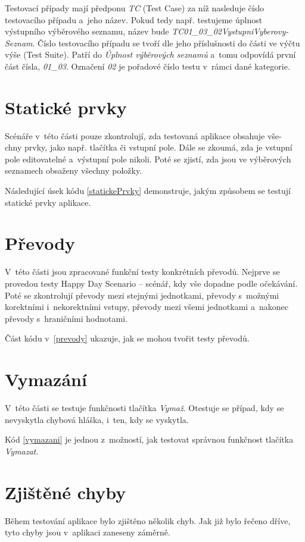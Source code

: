 	Testovací případy mají předponu \emph{TC} (Test Case) za níž nasleduje číslo testovacího případu a~jeho název. Pokud tedy např. testujeme úplnost výstupního výběrového seznamu, název bude \emph{TC01\_03\_02VystupniVyberovy-\\Seznam}. Číslo testovacího případu se tvoří dle jeho příslušnosti do části ve výčtu výše (Test Suite). Patří do \emph{Úplnost výběrových seznamů} a~tomu odpovídá první část čísla, \emph{01\_03}. Označení \emph{02} je pořadové číslo testu v~rámci dané kategorie.
		
	\section{Statické prvky}
	Scénáře v~této části pouze zkontrolují, zda testovaná aplikace obsahuje vše-\\chny prvky, jako např. tlačítka či vstupní pole. Dále se zkoumá, zda je vstupní pole editovatelné a~výstupní pole nikoli. Poté se zjistí, zda jsou ve výběrových seznamech obsaženy všechny položky.
	
	Následující úsek kódu \ref{statickePrvky} demonstruje, jakým způsobem se testují statické prvky aplikace.
	
	
	\section{Převody}
	V~této části jsou zpracované funkční testy konkrétních převodů. Nejprve se provedou testy Happy Day Scenario -- scénář, kdy vše dopadne podle očekávání. Poté se zkontrolují převody mezi stejnými jednotkami, převody s~možnými korektními i~nekorektními vstupy, převody mezi všemi jednotkami a~nakonec převody s~hraničními hodnotami.
	
	Část kódu v~\ref{prevody} ukazuje, jak se mohou tvořit testy převodů.
	
	
	\section{Vymazání}
	V~této části se testuje funkčnosti tlačítka \emph{Vymaž}. Otestuje se případ, kdy se nevyskytla chybová hláška, i~ten, kdy se vyskytla.
	
	Kód \ref{vymazani} je jednou z~možností, jak testovat správnou funkčnost tlačítka \emph{Vymazat}.
	
	
	\section{Zjištěné chyby}
	Během testování aplikace bylo zjištěno několik chyb. Jak již bylo řečeno dříve, tyto chyby jsou v~aplikaci zaneseny záměrně.
	
